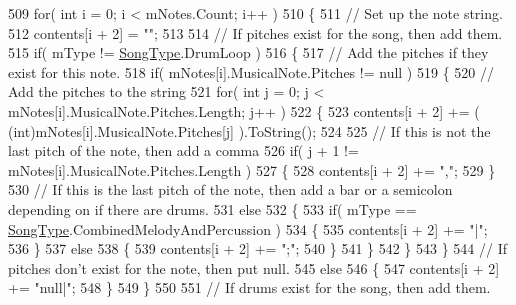 \begin{DoxyCodeInclude}
509         \textcolor{keywordflow}{for}( \textcolor{keywordtype}{int} i = 0; i < mNotes.Count; i++ )
510         \{
511             \textcolor{comment}{// Set up the note string.}
512             contents[i + 2] = \textcolor{stringliteral}{""};
513 
514             \textcolor{comment}{// If pitches exist for the song, then add them.}
515             \textcolor{keywordflow}{if}( mType != \hyperlink{group___song_enums_gae681a1f001333e39fc1cb4fea97bfe1b}{SongType}.DrumLoop )
516             \{
517                 \textcolor{comment}{// Add the pitches if they exist for this note.}
518                 \textcolor{keywordflow}{if}( mNotes[i].MusicalNote.Pitches != null )
519                 \{
520                     \textcolor{comment}{// Add the pitches to the string}
521                     \textcolor{keywordflow}{for}( \textcolor{keywordtype}{int} j = 0; j < mNotes[i].MusicalNote.Pitches.Length; j++ )
522                     \{
523                         contents[i + 2] += ( (int)mNotes[i].MusicalNote.Pitches[j] ).ToString();
524 
525                         \textcolor{comment}{// If this is not the last pitch of the note, then add a comma}
526                         \textcolor{keywordflow}{if}( j + 1 != mNotes[i].MusicalNote.Pitches.Length )
527                         \{
528                             contents[i + 2] += \textcolor{stringliteral}{","};
529                         \}
530                         \textcolor{comment}{// If this is the last pitch of the note, then add a bar or a semicolon depending
       on if there are drums.}
531                         \textcolor{keywordflow}{else}
532                         \{
533                             \textcolor{keywordflow}{if}( mType == \hyperlink{group___song_enums_gae681a1f001333e39fc1cb4fea97bfe1b}{SongType}.CombinedMelodyAndPercussion )
534                             \{
535                                 contents[i + 2] += \textcolor{stringliteral}{"|"};
536                             \}
537                             \textcolor{keywordflow}{else}
538                             \{
539                                 contents[i + 2] += \textcolor{stringliteral}{";"};
540                             \}
541                         \}
542                     \}
543                 \}
544                 \textcolor{comment}{// If pitches don't exist for the note, then put null.}
545                 \textcolor{keywordflow}{else}
546                 \{
547                     contents[i + 2] += \textcolor{stringliteral}{"null|"};
548                 \}
549             \}
550 
551             \textcolor{comment}{// If drums exist for the song, then add them.}

\end{DoxyCodeInclude}
